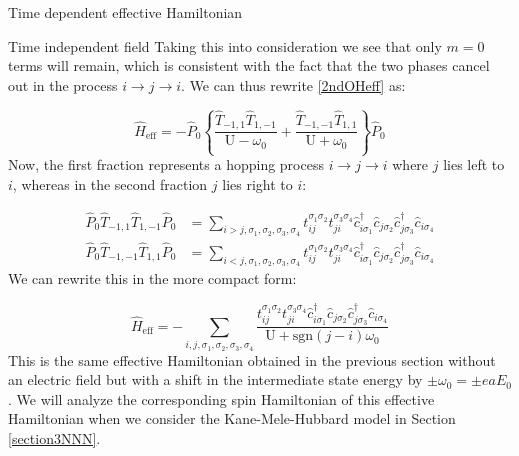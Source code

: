 \begin{section}{Time dependent effective Hamiltonian}
\begin{subsection}{Time independent field}
Taking this into consideration we see that only $m=0$ terms will remain, which is consistent with the fact that the two phases cancel out in the process $i \rightarrow j \rightarrow i$. We can thus rewrite \ref{2ndOHeff} as:

\begin{equation}
\hat{H}_{\text{eff}} = -\hat{P}_0 \left\{ \frac{\hat{T}_{-1,1}\hat{T}_{1,-1} }{\text{U}-\omega_0} + \frac{\hat{T}_{-1,-1}\hat{T}_{1,1} }{\text{U}+\omega_0} \right\} \hat{P}_0
\end{equation}
Now, the first fraction represents a hopping process $i\rightarrow j \rightarrow i$ where $j$ lies left to $i$, whereas in the second fraction $j$ lies right to $i$:

\begin{align*}
\hat{P}_0 \hat{T}_{-1,1} \hat{T}_{1,-1} \hat{P}_0 &= \sum_{i > j, \sigma_1, \sigma_2, \sigma_3, \sigma_4} t_{ij}^{\sigma_1 \sigma_2} t_{ji}^{\sigma_3 \sigma_4} \hat{c}_{i \sigma_1}^\dagger \hat{c}_{j \sigma_2} \hat{c}_{j \sigma_3}^\dagger \hat{c}_{i \sigma_4} \\
\hat{P}_0 \hat{T}_{-1,-1} \hat{T}_{1,1} \hat{P}_0 &= \sum_{i < j, \sigma_1, \sigma_2, \sigma_3, \sigma_4} t_{ij}^{\sigma_1 \sigma_2} t_{ji}^{\sigma_3 \sigma_4} \hat{c}_{i \sigma_1}^\dagger \hat{c}_{j \sigma_2} \hat{c}_{j \sigma_3}^\dagger \hat{c}_{i \sigma_4} 
\end{align*}
We can rewrite this in the more compact form:

\begin{equation}
\label{TimeIndepHeff}
\hat{H}_{\text{eff}} = -\sum_{i, j, \sigma_1, \sigma_2, \sigma_3, \sigma_4} \frac{t_{ij}^{\sigma_1 \sigma_2} t_{ji}^{\sigma_3 \sigma_4} \hat{c}_{i \sigma_1}^\dagger \hat{c}_{j \sigma_2} \hat{c}_{j \sigma_3}^\dagger \hat{c}_{i \sigma_4}}{\text{U} + \text{sgn}(j-i)\omega_0}
\end{equation}
This is the same effective Hamiltonian obtained in the previous section without an electric field but with a shift in the intermediate state energy by $\pm \omega_0 = \pm eaE_0$. We will analyze the corresponding spin Hamiltonian of this effective Hamiltonian when we consider the Kane-Mele-Hubbard model in Section \ref{section3NNN}.

\end{subsection}

\end{section}
